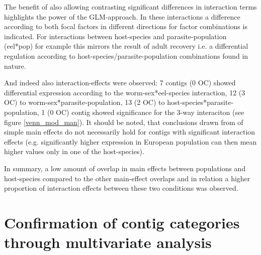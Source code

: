 The benefit of also allowing contrasting significant differences in
interaction terms highlights the power of the GLM-approach. In these
interactions a difference according to both focal factors in different
directions for factor combinations is indicated. For interactions
between host-species and parasite-population (eel*pop) for example
this mirrors the result of adult recovery i.e. a differential
regulation according to host-species/parasite-population combinations
found in nature.

And indeed also interaction-effects were observed: 7 contigs (0 OC)
showed differential expression according to the worm-sex*eel-species
interaction, 12 (3 OC) to worm-sex*parasite-population, 13 (2 OC) to
host-species*parasite-population, 1 (0 OC) contig showed significance
for the 3-way interaciton (see figure \ref{venn_mod_man}). It should
be noted, that conclusions drawn from of simple main effects do not
necessarily hold for contigs with significant interaction effects
(e.g. significantly higher expression in European population can then
mean higher values only in one of the host-species).


\afterpage{\clearpage}

In summary, a low amount of overlap in main effects between
populations and host-species compared to the other main-effect
overlaps and in relation a higher proportion of interaction effects
between these two conditions was observed.

\section{Confirmation of contig categories through multivariate
  analysis}

